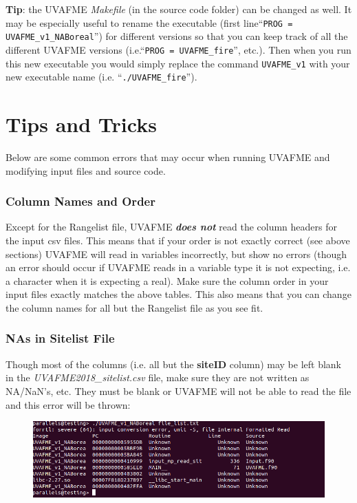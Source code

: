 \documentclass[a4paper, 12pt] {article}
\begin{document}
\textbf{Tip}: the UVAFME \textit{Makefile} (in the source code folder) can be changed as well. It may be especially useful to rename the executable (first line``\texttt{PROG = UVAFME\_v1\_NABoreal}”) for different versions so that you can keep track of all the different UVAFME versions (i.e.``\texttt{PROG = UVAFME\_fire}”, etc.). Then when you run this new executable you would simply replace the command \texttt{UVAFME\_v1} with your new executable name (i.e. ``\texttt{./UVAFME\_fire}”).

\section{Tips and Tricks} \label{tips}

Below are some common errors that may occur when running UVAFME and modifying input files and source code.

\subsubsection{Column Names and Order}
Except for the Rangelist file, UVAFME \textbf{\textit{does not}} read the column headers for the input csv files. This means that if your order is not exactly correct (see above sections) UVAFME will read in variables incorrectly, but show no errors (though an error should occur if UVAFME reads in a variable type it is not expecting, i.e. a character when it is expecting a real). Make sure the column order in your input files exactly matches the above tables. This also means that you can change the column names for all but the Rangelist file as you see fit.

\subsubsection{NAs in Sitelist File}
Though most of the columns (i.e. all but the \textbf{siteID} column) may be left blank in the \textit{UVAFME2018\_sitelist.csv} file, make sure they are not written as NA/NaN's, etc. They must be blank or UVAFME will not be able to read the file and this error will be thrown:

\begin{figure}[ht]
  \includegraphics[width=\linewidth]{manual_figures/Terminal_NAs.png}
\end{figure}
\end{document}
